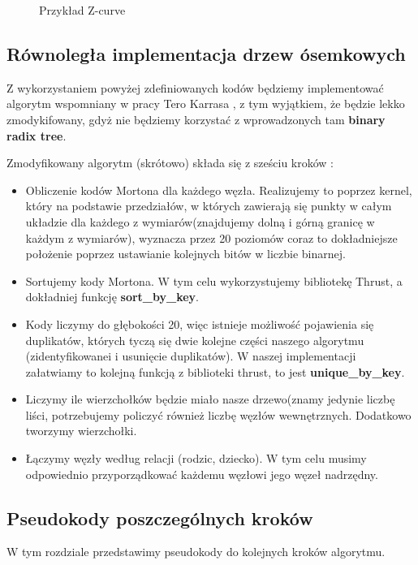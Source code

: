 \documentclass[14pt,twoside,a4paper]{article}
\theoremstyle{definition}
\begin{document}
\begin{figure}[h]
    \centering      
    \def\svgscale{0.53}
    
    \caption{Przykład Z-curve}
    \label{fig:krzywa}
\end{figure}


\subsection{\Large Równoległa implementacja drzew ósemkowych}
Z wykorzystaniem powyżej zdefiniowanych kodów będziemy implementować algorytm wspomniany w pracy Tero Karrasa \cite{tero}, z tym wyjątkiem, że będzie lekko zmodykifowany, gdyż nie będziemy korzystać z wprowadzonych tam \textbf{binary radix tree}.

Zmodyfikowany algorytm (skrótowo) składa się z sześciu kroków :
\begin{itemize}
\item Obliczenie kodów Mortona dla każdego węzła. Realizujemy to poprzez kernel, który na podstawie przedziałów, w których zawierają się punkty w całym układzie dla każdego z wymiarów(znajdujemy dolną i górną granicę w każdym z wymiarów), wyznacza przez 20 poziomów coraz to dokładniejsze położenie poprzez ustawianie kolejnych bitów w liczbie binarnej. 
\item Sortujemy kody Mortona. W tym celu wykorzystujemy bibliotekę Thrust, a dokładniej funkcję \textbf{sort\_by\_key}. 
\item Kody liczymy do głębokości 20, więc istnieje możliwość pojawienia się duplikatów, których tyczą się dwie kolejne części naszego algorytmu (zidentyfikowanei i usunięcie duplikatów). W naszej implementacji załatwiamy to kolejną funkcją z biblioteki thrust, to jest \textbf{unique\_by\_key}.
\item Liczymy ile wierzchołków będzie miało nasze drzewo(znamy jedynie liczbę liści, potrzebujemy policzyć również liczbę węzłów wewnętrznych. Dodatkowo tworzymy wierzchołki.
\item  Łączymy węzły według relacji (rodzic, dziecko). W tym celu musimy odpowiednio przyporządkować każdemu węzłowi jego węzeł nadrzędny.
\end{itemize}

\subsection{\Large Pseudokody poszczególnych kroków}
W tym rozdziale przedstawimy pseudokody do kolejnych kroków algorytmu.
\end{document}

